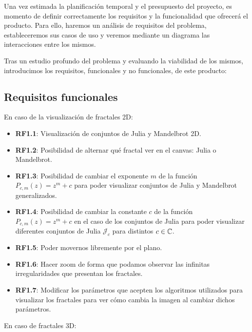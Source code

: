Una vez estimada la planificación temporal y el presupuesto del proyecto, es momento de definir correctamente los requisitos y la funcionalidad que ofrecerá el producto. Para ello, haremos un análisis de requisitos del problema, estableceremos sus casos de uso y veremos mediante un diagrama las interacciones entre los mismos.

Tras un estudio profundo del problema y evaluando la viabilidad de los mismos, introducimos los requisitos, funcionales y no funcionales, de este producto:

\subsection{Requisitos funcionales}
En caso de la visualización de fractales 2D:
\begin{itemize}
    \item \textbf{RF1.1}: Visualización de conjuntos de Julia y Mandelbrot 2D.
    \item \textbf{RF1.2}: Posibilidad de alternar qué fractal ver en el canvas: Julia o Mandelbrot.
    \item \textbf{RF1.3}: Posibilidad de cambiar el exponente $m$ de la función $P_{c,m}(z)=z^m+c$ para poder visualizar conjuntos de Julia y Mandelbrot generalizados.
    \item \textbf{RF1.4}: Posibilidad de cambiar la constante $c$ de la función $P_{c,m}(z)=z^m+c$ en el caso de los conjuntos de Julia para poder visualizar diferentes conjuntos de Julia $\mathcal{J}_c$ para distintos $c\in\mathbb{C}$.
    \item \textbf{RF1.5}: Poder movernos libremente por el plano.
    \item \textbf{RF1.6}: Hacer zoom de forma que podamos observar las infinitas irregularidades que presentan los fractales.
    \item \textbf{RF1.7}: Modificar los parámetros que acepten los algoritmos utilizados para visualizar los fractales para ver cómo cambia la imagen al cambiar dichos parámetros.
\end{itemize}
En caso de fractales 3D:
